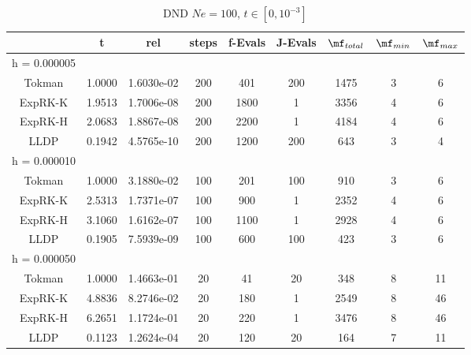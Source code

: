 \begin{table}
\begin{tabular}{c|c|c|c|c|c|c|c|c}
& t & rel & steps & f-Evals & J-Evals & $\mf_{total}$ & $\mf_{min}$ & $\mf_{max}$ \\
\hline h = 0.000005 &  &  &  &  &  &  &  &  \\
Tokman & 1.0000 & 1.6030e-02 & 200 & 401 & 200 & 1475 & 3 & 6  \\
ExpRK-K & 1.9513 & 1.7006e-08 & 200 & 1800 & 1 & 3356 & 4 & 6  \\
ExpRK-H & 2.0683 & 1.8867e-08 & 200 & 2200 & 1 & 4184 & 4 & 6  \\
LLDP & 0.1942 & 4.5765e-10 & 200 & 1200 & 200 & 643 & 3 & 4  \\
\hline
\hline h = 0.000010 &  &  &  &  &  &  &  &  \\
Tokman & 1.0000 & 3.1880e-02 & 100 & 201 & 100 & 910 & 3 & 6  \\
ExpRK-K & 2.5313 & 1.7371e-07 & 100 & 900 & 1 & 2352 & 4 & 6  \\
ExpRK-H & 3.1060 & 1.6162e-07 & 100 & 1100 & 1 & 2928 & 4 & 6  \\
LLDP & 0.1905 & 7.5939e-09 & 100 & 600 & 100 & 423 & 3 & 6  \\
\hline
\hline h = 0.000050 &  &  &  &  &  &  &  &  \\
Tokman & 1.0000 & 1.4663e-01 & 20 & 41 & 20 & 348 & 8 & 11  \\
ExpRK-K & 4.8836 & 8.2746e-02 & 20 & 180 & 1 & 2549 & 8 & 46  \\
ExpRK-H & 6.2651 & 1.1724e-01 & 20 & 220 & 1 & 3476 & 8 & 46  \\
LLDP & 0.1123 & 1.2624e-04 & 20 & 120 & 20 & 164 & 7 & 11  \\
\hline
\end{tabular}
\caption{DND $Ne=100$, $t\in [0,10^{-3}]$}\\
\end{table}